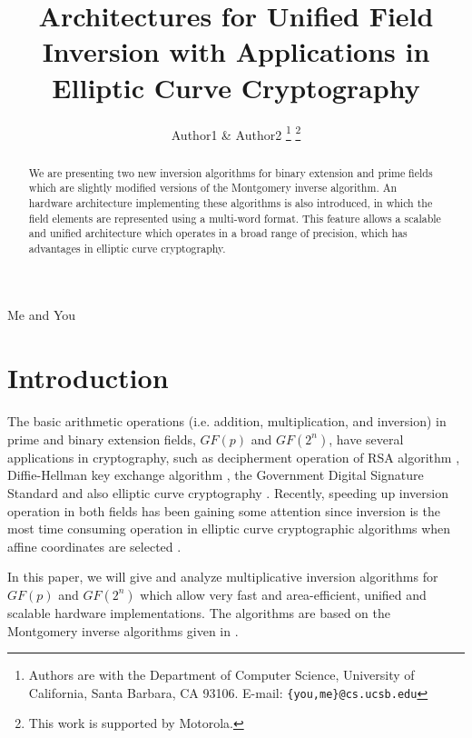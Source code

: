 \documentclass[twocolumn]{IEEEtran}
\begin{document}
\title{Architectures for Unified Field Inversion with Applications 
in Elliptic Curve Cryptography}


\author{Author1 \& Author2
\thanks{Authors are with the
Department of Computer Science,
University of California, Santa Barbara, CA 93106.
E-mail: \texttt{\{you,me\}@cs.ucsb.edu}}
\thanks{This work is supported by Motorola.}
}

{Me and You}

\maketitle

\begin{abstract}
We are presenting two new inversion algorithms for binary extension
and prime fields which are slightly modified versions of the
Montgomery inverse algorithm. An hardware architecture implementing
these algorithms is also introduced, in which the field elements
are represented using a multi-word format. This feature allows a
scalable and unified architecture which operates in a broad range 
of precision, which has advantages in elliptic curve cryptography.
\end{abstract}

\section {Introduction}

The basic arithmetic operations (i.e. addition, multiplication, and 
inversion) in prime and binary extension fields, $GF(p)$ and $GF(2^n)$, 
have several applications in cryptography, such as decipherment 
operation of RSA algorithm \cite{QC82:Fast}, Diffie-Hellman key exchange 
algorithm \cite{DH76:New}, the Government Digital Signature Standard 
\cite{NIST91:DSS} and also elliptic curve cryptography 
\cite{K87:Elliptic,M93:Elliptic}. Recently, speeding up inversion operation
in both fields has been gaining some attention since inversion is the
most time consuming operation in elliptic curve cryptographic algorithms 
when affine coordinates are selected \cite{K95:The,SOOS95:Fast,%
K99:Fast,SK00:The,H01:Efficient}.

In this paper, we will give and analyze multiplicative inversion algorithms
for $GF(p)$ and $GF(2^n)$ which allow very fast and area-efficient, unified
and scalable hardware
implementations. The algorithms are based on the Montgomery inverse algorithms 
given in \cite{K95:The}. 
\end{document}
